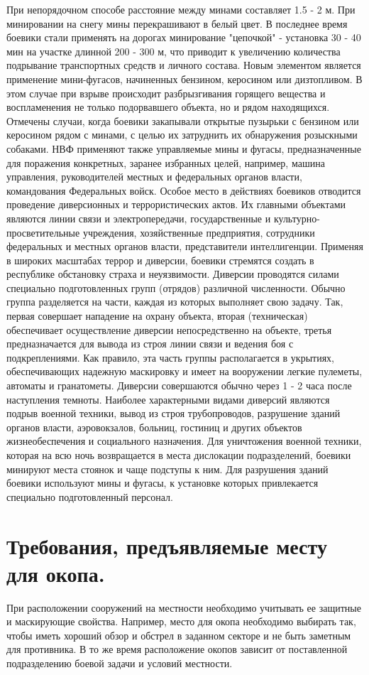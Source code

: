 \documentclass[12pt,a4paper]{report}
\begin{document}
При непорядочном способе расстояние между минами составляет 1.5 - 2 м. При минировании на снегу мины перекрашивают в белый цвет. В последнее время боевики стали применять на дорогах минирование "цепочкой" - установка 30 - 40 мин на участке длинной 200 - 300 м, что приводит к увеличению количества подрывание транспортных средств и личного состава. Новым элементом является применение мини-фугасов, начиненных бензином, керосином или дизтопливом. В этом случае при взрыве происходит разбрызгивания горящего вещества и воспламенения не только подорвавшего объекта, но и рядом находящихся. Отмечены случаи, когда боевики закапывали открытые пузырьки с бензином или керосином рядом с минами, с целью их затруднить их обнаружения розыскными собаками. НВФ применяют также управляемые мины и фугасы, предназначенные для поражения конкретных, заранее избранных целей, например, машина управления, руководителей местных и федеральных органов власти, командования Федеральных войск. Особое место в действиях боевиков отводится проведение диверсионных и террористических актов. Их главными объектами являются линии связи и электропередачи, государственные и культурно-просветительные учреждения, хозяйственные предприятия, сотрудники федеральных и местных органов власти, представители интеллигенции. Применяя в широких масштабах террор и диверсии, боевики стремятся создать в республике обстановку страха и неуязвимости. Диверсии проводятся силами специально подготовленных групп (отрядов) различной численности. Обычно группа разделяется на части, каждая из которых выполняет свою задачу. Так, первая совершает нападение на охрану объекта, вторая (техническая) обеспечивает осуществление диверсии непосредственно на объекте, третья предназначается для вывода из строя линии связи и ведения боя с подкреплениями. Как правило, эта часть группы располагается в укрытиях, обеспечивающих надежную маскировку и имеет на вооружении легкие пулеметы, автоматы и гранатометы. Диверсии совершаются обычно через 1 - 2 часа после наступления темноты. Наиболее характерными видами диверсий являются подрыв военной техники, вывод из строя трубопроводов, разрушение зданий органов власти, аэровокзалов, больниц, гостиниц и других объектов жизнеобеспечения и социального назначения. Для уничтожения военной техники, которая на всю ночь возвращается в места дислокации подразделений, боевики минируют места стоянок и чаще подступы к ним. Для разрушения зданий боевики используют мины и фугасы, к установке которых привлекается специально подготовленный персонал.


\section{Требования, предъявляемые месту для окопа.}
При расположении сооружений на местности необходимо учитывать ее защитные и маскирующие свойства. Например, место для окопа необходимо выбирать так, чтобы иметь хороший обзор и обстрел в заданном секторе и не быть заметным для противника. В то же время расположение окопов зависит от поставленной подразделению боевой задачи и условий местности.
\end{document}
